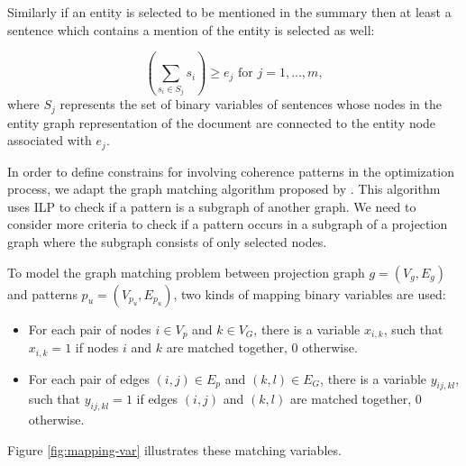 Similarly if an entity is selected to be mentioned in the summary then at least a sentence which contains a mention of the entity is selected as well:   

\begin{equation}
(\sum_{s_i \in S_j}{s_i}) \ge e_j\text{ for }j = 1,...,m,
\end{equation}
where $S_j$ represents the set of binary variables of sentences whose nodes in the entity graph representation of the document are connected to the entity node associated with $e_j$.  

In order to define constrains for involving coherence patterns in the optimization process, we adapt the graph matching algorithm proposed by .
This algorithm uses ILP to check if a pattern is a subgraph of another graph. 
We need to consider more criteria to check if a pattern occurs in a subgraph of a projection graph where the subgraph consists of only selected nodes. 

To model the graph matching problem between projection graph $g=(V_{g},E_{g})$ and patterns $p_{u}=(V_{p_{u}},E_{p_{u}})$, two kinds of mapping binary variables are used: 

\begin{itemize}

	\item 
	For each pair of nodes $i \in V_{p}$ and $k \in V_G$, there is a variable $x_{i,k}$, such that $x_{i,k} = 1$ if nodes $i$ and $k$ are matched together, $0$ otherwise. 

	\item For each pair of edges $(i,j) \in E_{p}$ and $(k,l) \in E_G$, there is a variable $y_{ij,kl}$, such that $y_{ij,kl} = 1$ if edges $(i,j)$ and $(k,l)$ are matched together, $0$ otherwise.

\end{itemize}

Figure \ref{fig:mapping-var} illustrates these matching variables. 

